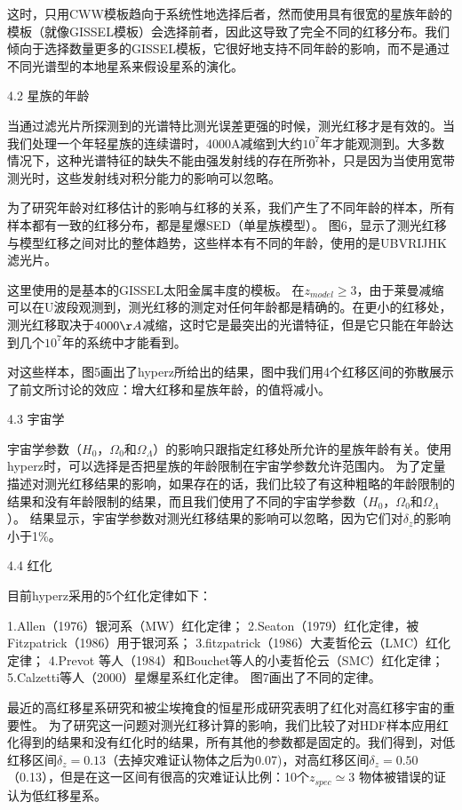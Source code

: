 \documentclass[8pt,a4paper,openany,twoside]{book}
\begin{document}
这时，只用CWW模板趋向于系统性地选择后者，然而使用具有很宽的星族年龄的模板（就像GISSEL模板）会选择前者，因此这导致了完全不同的红移分布。我们倾向于选择数量更多的GISSEL模板，它很好地支持不同年龄的影响，而不是通过不同光谱型的本地星系来假设星系的演化。
 
4.2 星族的年龄
 
当通过滤光片所探测到的光谱特比测光误差更强的时候，测光红移才是有效的。当我们处理一个年轻星族的连续谱时，4000A减缩到大约$10^7$年才能观测到。大多数情况下，这种光谱特征的缺失不能由强发射线的存在所弥补，只是因为当使用宽带测光时，这些发射线对积分能力的影响可以忽略。
 
为了研究年龄对红移估计的影响与红移的关系，我们产生了不同年龄的样本，所有样本都有一致的红移分布，都是星爆SED（单星族模型）。
图6，显示了测光红移与模型红移之间对比的整体趋势，这些样本有不同的年龄，使用的是UBVRIJHK滤光片。
 
 
这里使用的是基本的GISSEL太阳金属丰度的模板。
在$z_{model}\geq3$，由于莱曼减缩可以在U波段观测到，测光红移的测定对任何年龄都是精确的。在更小的红移处，测光红移取决于$4000\AA$减缩，这时它是最突出的光谱特征，但是它只能在年龄达到几个$10^7$年的系统中才能看到。
 
对这些样本，图5画出了hyperz所给出的结果，图中我们用4个红移区间的弥散展示了前文所讨论的效应：增大红移和星族年龄，的值将减小。
 
4.3 宇宙学
 
宇宙学参数（$H_0$，$\Omega_0$和$\Omega_\Lambda$）的影响只跟指定红移处所允许的星族年龄有关。使用hyperz时，可以选择是否把星族的年龄限制在宇宙学参数允许范围内。
为了定量描述对测光红移结果的影响，如果存在的话，我们比较了有这种粗略的年龄限制的结果和没有年龄限制的结果，而且我们使用了不同的宇宙学参数（$H_0$，$\Omega_0$和$\Omega_\Lambda$）。
结果显示，宇宙学参数对测光红移结果的影响可以忽略，因为它们对$\delta_z$的影响小于1\%。
 
 
 
 
 
4.4 红化
 
目前hyperz采用的5个红化定律如下：
 
1.Allen（1976）银河系（MW）红化定律；
2.Seaton（1979）红化定律，被Fitzpatrick（1986）用于银河系；
3.fitzpatrick（1986）大麦哲伦云（LMC）红化定律；
4.Prevot 等人（1984）和Bouchet等人的小麦哲伦云（SMC）红化定律；
5.Calzetti等人（2000）星爆星系红化定律。
图7画出了不同的定律。
 
最近的高红移星系研究和被尘埃掩食的恒星形成研究表明了红化对高红移宇宙的重要性。
为了研究这一问题对测光红移计算的影响，我们比较了对HDF样本应用红化得到的结果和没有红化时的结果，所有其他的参数都是固定的。我们得到，对低红移区间$\delta_z=0.13$（去掉灾难证认物体之后为0.07)，对高红移区间$\delta_z=0.50$（0.13），但是在这一区间有很高的灾难证认比例：10个$z_{spec} \simeq 3$ 物体被错误的证认为低红移星系。
 
\end{document}
